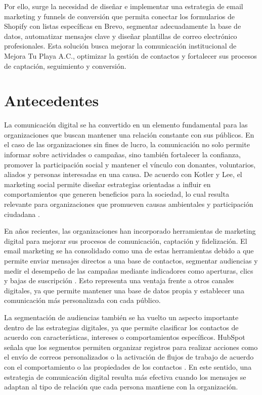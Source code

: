 Por ello, surge la necesidad de diseñar e implementar una estrategia de email marketing y funnels de conversión que permita conectar los formularios de Shopify con listas específicas en Brevo, segmentar adecuadamente la base de datos, automatizar mensajes clave y diseñar plantillas de correo electrónico profesionales. Esta solución busca mejorar la comunicación institucional de Mejora Tu Playa A.C., optimizar la gestión de contactos y fortalecer sus procesos de captación, seguimiento y conversión.

\section{Antecedentes}

La comunicación digital se ha convertido en un elemento fundamental para las organizaciones que buscan mantener una relación constante con sus públicos. En el caso de las organizaciones sin fines de lucro, la comunicación no solo permite informar sobre actividades o campañas, sino también fortalecer la confianza, promover la participación social y mantener el vínculo con donantes, voluntarios, aliados y personas interesadas en una causa. De acuerdo con Kotler y Lee, el marketing social permite diseñar estrategias orientadas a influir en comportamientos que generen beneficios para la sociedad, lo cual resulta relevante para organizaciones que promueven causas ambientales y participación ciudadana \cite{kotler_lee_social_marketing}.

En años recientes, las organizaciones han incorporado herramientas de marketing digital para mejorar sus procesos de comunicación, captación y fidelización. El email marketing se ha consolidado como una de estas herramientas debido a que permite enviar mensajes directos a una base de contactos, segmentar audiencias y medir el desempeño de las campañas mediante indicadores como aperturas, clics y bajas de suscripción \cite{mailchimp_benchmarks}. Esto representa una ventaja frente a otros canales digitales, ya que permite mantener una base de datos propia y establecer una comunicación más personalizada con cada público.

La segmentación de audiencias también se ha vuelto un aspecto importante dentro de las estrategias digitales, ya que permite clasificar los contactos de acuerdo con características, intereses o comportamientos específicos. HubSpot señala que los segmentos permiten organizar registros para realizar acciones como el envío de correos personalizados o la activación de flujos de trabajo de acuerdo con el comportamiento o las propiedades de los contactos \cite{hubspot_segments}. En este sentido, una estrategia de comunicación digital resulta más efectiva cuando los mensajes se adaptan al tipo de relación que cada persona mantiene con la organización.

